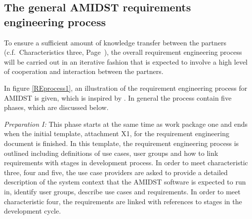 


\subsection{The general AMIDST requirements engineering process}
\label{sec:reprocess}

To ensure a sufficient amount of knowledge transfer between the partners (c.f.\ Characteristics three, Page~\pageref{sec:characteristic3}),
the overall  requirement engineering process will be carried out in an iterative fashion that is expected to involve a
high level of cooperation and interaction between the partners.  

In figure \ref{REprocess1}, an illustration of the requirement engineering process for AMIDST is given, which is inspired by \cite{Ebe10}.  In general the process contain five phases, which are discussed below.

\emph{Preparation I:}  This phase starts at the same time as work package one and ends when the initial template, attachment X1, for the requirement engineering document is finished.  In this template, the requirement engineering process is outlined including definitions of use cases, user groups and how to link requirements with stages in development process.  In order to meet characteristic three, four and five, the use case providers are asked to provide a detailed description of the system context that the AMIDST software is expected to run in, identify user groups, describe use cases and requirements.  In order to meet characteristic four, the requirements are linked with references to stages in the development cycle. 

